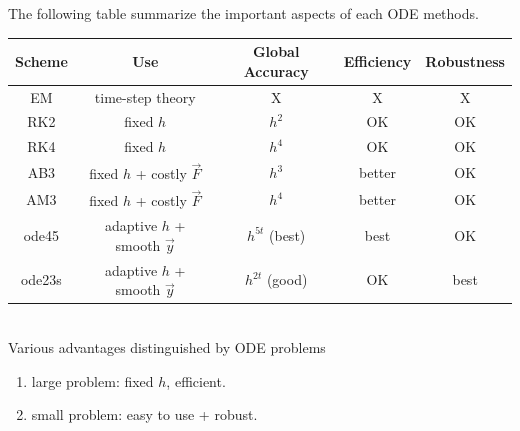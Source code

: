 \begin{summary}
	The following table summarize the important aspects of each ODE methods.\\
	
	\begin{tabular}{|c|c|c|c|c|}
		\hline 
		Scheme & Use & Global Accuracy & Efficiency & Robustness \\ 
		\hline 
		EM & time-step theory & X & X & X \\ 
		\hline 
		RK2 & fixed $h$ & $h^2$& OK & OK \\ 
		\hline 
		RK4 & fixed $h$ & $h^4$ & OK & OK \\ 
		\hline 
		AB3 & fixed $h$ + costly $\vec{F}$ & $h^3$ & better & OK \\ 
		\hline 
		AM3 & fixed $h$ + costly $\vec{F}$ & $h^4$ & better & OK \\ 
		\hline 
		ode45 & adaptive $h$ + smooth $\vec{y}$ & $h^{5t}$ (best) & best & OK \\ 
		\hline 
		ode23s & adaptive $h$ + smooth $\vec{y}$ & $h^{2t}$ (good)& OK & best \\ 
		\hline 
	\end{tabular} \\

	Various advantages distinguished by ODE problems
	\begin{enumerate}
		\item []
		large problem: fixed $h$, efficient.
		\item []
		small problem: easy to use + robust.
	\end{enumerate}
\end{summary}